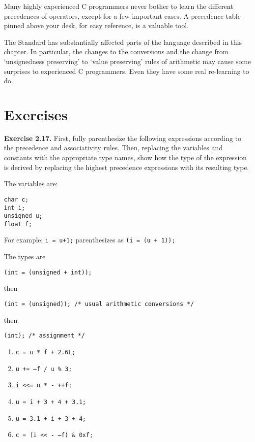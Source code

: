   Many highly experienced C programmers never bother to learn the
   different precedences of operators, except for a few important cases. A
   precedence table pinned above your desk, for easy reference, is a valuable
   tool.


  The Standard has substantially affected parts of the language described
   in this chapter. In particular, the changes to the conversions and the
   change from `unsignedness preserving' to `value preserving'
   rules of arithmetic may cause some surprises to experienced
   C programmers.  Even they have some real re-learning to do.


 
        \section{Exercises}
        


  \textbf{Exercise 2.17.} First, fully parenthesize the following expressions according to the
    precedence and associativity rules. Then, replacing the variables and
    constants with the appropriate type names, show how the type of the
    expression is derived by replacing the highest precedence expressions with
    its resulting type.

The variables are:

\begin{Verbatim}
char c;
int i;
unsigned u;
float f;
\end{Verbatim}
For example: \texttt{i = u+1;} parenthesizes
    as \texttt{(i = (u + 1));}

The types are

\begin{Verbatim}
(int = (unsigned + int));
\end{Verbatim}
then

\begin{Verbatim}
(int = (unsigned)); /* usual arithmetic conversions */
\end{Verbatim}
then

\begin{Verbatim}
(int); /* assignment */
\end{Verbatim}
\begin{enumerate}
    \item \texttt{c = u * f + 2.6L;}
    \item \texttt{u += --f / u \% 3;}
    \item \texttt{i <{}<= u * - ++f;}
    \item \texttt{u = i + 3 + 4 + 3.1;}
    \item \texttt{u = 3.1 + i + 3 + 4;}
    \item \texttt{c = (i <{}< - --f) \& 0xf;}
   \end{enumerate}

